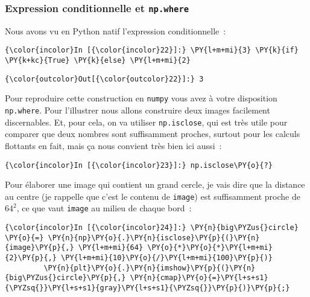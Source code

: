     \hypertarget{expression-conditionnelle-et-np.where}{%
\subsubsection{\texorpdfstring{Expression conditionnelle et
\texttt{np.where}}{Expression conditionnelle et np.where}}\label{expression-conditionnelle-et-np.where}}

    Nous avons vu en Python natif l'expression conditionnelle~:

    \begin{Verbatim}[commandchars=\\\{\}]
{\color{incolor}In [{\color{incolor}22}]:} \PY{l+m+mi}{3} \PY{k}{if} \PY{k+kc}{True} \PY{k}{else} \PY{l+m+mi}{2}
\end{Verbatim}


\begin{Verbatim}[commandchars=\\\{\}]
{\color{outcolor}Out[{\color{outcolor}22}]:} 3
\end{Verbatim}
            
    Pour reproduire cette construction en \texttt{numpy} vous avez à votre
disposition \texttt{np.where}. Pour l'illustrer nous allons construire
deux images facilement discernables. Et, pour cela, on va utiliser
\texttt{np.isclose}, qui est très utile pour comparer que deux nombres
sont suffisamment proches, surtout pour les calculs flottants en fait,
mais ça nous convient très bien ici aussi~:

    \begin{Verbatim}[commandchars=\\\{\}]
{\color{incolor}In [{\color{incolor}23}]:} np.isclose\PY{o}{?}
\end{Verbatim}


    Pour élaborer une image qui contient un grand cercle, je vais dire que
la distance au centre (je rappelle que c'est le contenu de
\texttt{image}) est suffisamment proche de \(64^2\), ce que vaut
\texttt{image} au milieu de chaque bord~:

    \begin{Verbatim}[commandchars=\\\{\}]
{\color{incolor}In [{\color{incolor}24}]:} \PY{n}{big\PYZus{}circle} \PY{o}{=} \PY{n}{np}\PY{o}{.}\PY{n}{isclose}\PY{p}{(}\PY{n}{image}\PY{p}{,} \PY{l+m+mi}{64} \PY{o}{*}\PY{o}{*}\PY{l+m+mi}{2}\PY{p}{,} \PY{l+m+mi}{10}\PY{o}{/}\PY{l+m+mi}{100}\PY{p}{)}
         \PY{n}{plt}\PY{o}{.}\PY{n}{imshow}\PY{p}{(}\PY{n}{big\PYZus{}circle}\PY{p}{,} \PY{n}{cmap}\PY{o}{=}\PY{l+s+s1}{\PYZsq{}}\PY{l+s+s1}{gray}\PY{l+s+s1}{\PYZsq{}}\PY{p}{)}\PY{p}{;}
\end{Verbatim}


